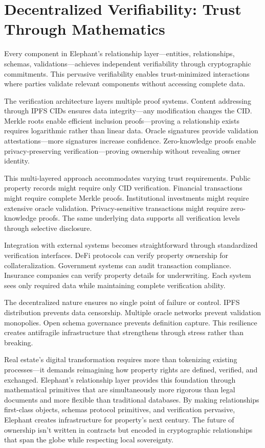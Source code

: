 \section{Decentralized Verifiability: Trust Through Mathematics}

Every component in Elephant's relationship layer—entities, relationships, schemas, validations—achieves independent verifiability through cryptographic commitments. This pervasive verifiability enables trust-minimized interactions where parties validate relevant components without accessing complete data.

The verification architecture layers multiple proof systems. Content addressing through IPFS CIDs ensures data integrity—any modification changes the CID. Merkle roots enable efficient inclusion proofs—proving a relationship exists requires logarithmic rather than linear data. Oracle signatures provide validation attestations—more signatures increase confidence. Zero-knowledge proofs enable privacy-preserving verification—proving ownership without revealing owner identity.

This multi-layered approach accommodates varying trust requirements. Public property records might require only CID verification. Financial transactions might require complete Merkle proofs. Institutional investments might require extensive oracle validation. Privacy-sensitive transactions might require zero-knowledge proofs. The same underlying data supports all verification levels through selective disclosure.

Integration with external systems becomes straightforward through standardized verification interfaces. DeFi protocols can verify property ownership for collateralization. Government systems can audit transaction compliance. Insurance companies can verify property details for underwriting. Each system sees only required data while maintaining complete verification ability.

The decentralized nature ensures no single point of failure or control. IPFS distribution prevents data censorship. Multiple oracle networks prevent validation monopolies. Open schema governance prevents definition capture. This resilience creates antifragile infrastructure that strengthens through stress rather than breaking.

Real estate's digital transformation requires more than tokenizing existing processes—it demands reimagining how property rights are defined, verified, and exchanged. Elephant's relationship layer provides this foundation through mathematical primitives that are simultaneously more rigorous than legal documents and more flexible than traditional databases. By making relationships first-class objects, schemas protocol primitives, and verification pervasive, Elephant creates infrastructure for property's next century. The future of ownership isn't written in contracts but encoded in cryptographic relationships that span the globe while respecting local sovereignty.